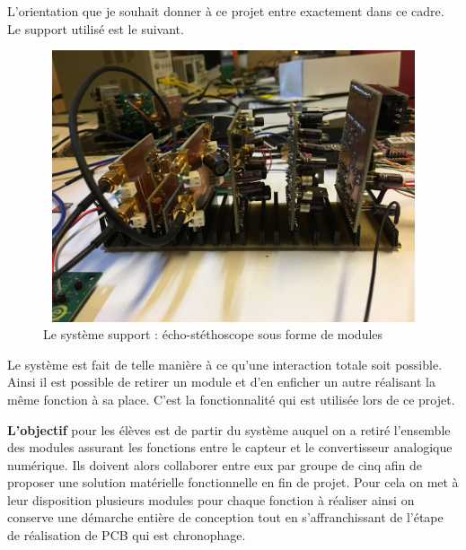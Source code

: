 \documentclass[12pt]{article}
\begin{document}
L'orientation que je souhait donner à ce projet entre exactement dans ce cadre. Le support utilisé est le suivant.

\begin{figure}[!h]
\centering
\includegraphics[width=14cm,height=8cm,trim=0cm 0cm 0cm 0cm, clip=true]{Images_Rapport/stacks}
\caption{Le système support : écho-stéthoscope sous forme de modules}
\end{figure} 

Le système est fait de telle manière à ce qu'une interaction totale soit possible. Ainsi il est possible de retirer un module et d'en enficher un autre réalisant la même fonction à sa place. C'est la fonctionnalité qui est utilisée lors de ce projet. \par
\vspace{10pt}

\textbf{L'objectif} pour les élèves est de partir du système auquel on a retiré l'ensemble des modules assurant les fonctions entre le capteur et le convertisseur analogique numérique. Ils doivent alors collaborer entre eux par groupe de cinq afin de proposer une solution matérielle fonctionnelle en fin de projet. Pour cela on met à leur disposition plusieurs modules pour chaque fonction à réaliser ainsi on conserve une démarche entière de conception tout en s'affranchissant de l'étape de réalisation de PCB qui est chronophage.

\newpage
\end{document}
